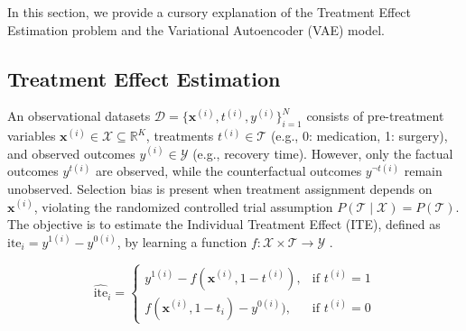 \documentclass[doubleblind]{ecai}
\begin{document}
	In this section, we provide a cursory explanation of the Treatment Effect Estimation problem and the Variational Autoencoder (VAE) model. 
	
	\subsection{Treatment Effect Estimation}
	\label{sec:background-tee}
	
	
	An observational datasets $\mathcal{D} = \{ \mathbf{x}^{(i)}, t^{(i)}, y^{(i)}\}_{i=1}^N$ consists of pre-treatment variables $\mathbf{x}^{(i)} \in \mathcal{X} \subseteq \mathbb{R}^K$, treatments $t^{(i)} \in \mathcal{T}$ (e.g., {0: medication, 1: surgery}), and observed outcomes $y^{(i)} \in \mathcal{Y}$ (e.g., recovery time). 
	However, only the factual outcomes $y^{t(i)}$ are observed, while the counterfactual outcomes $y^{\neg t (i)}$ remain unobserved. 
	Selection bias is present when treatment assignment depends on $\mathbf{x}^{(i)}$, violating the randomized controlled trial assumption $P(\mathcal{T} \mid \mathcal{X}) = P(\mathcal{T})$. 
	The objective is to estimate the Individual Treatment Effect (ITE), defined as $ \mathrm{ite}_{i} = y^{1(i)} - y^{0(i)}$, by learning a function $f \colon \mathcal{X} \times \mathcal{T} \to \mathcal{Y}$ \citep{Negar,Khan2024OnTE}.
	
	\begin{equation}
		\widehat{\text{ite}}_i =
		\begin{cases}
			y^{1(i)} - f(\mathbf{x}^{(i)}, 1 - t^{(i)}), & \text{if } t^{(i)} = 1 \\
			f(\mathbf{x}^{(i)}, 1 - t_i) - y^{0(i)} ), & \text{if } t^{(i)} = 0
		\end{cases}
	\end{equation}
\end{document}
